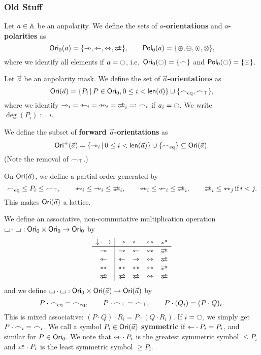 \documentclass[a4paper]{memoir}
\begin{document}
\subsubsection{Old Stuff}
\begin{definition}\label{def:orisymbol}
	Let $a \in {\mathbb{A}}$ be an anpolarity.
	We define the sets of \textbf{$a$-orientations} and \textbf{$a$-polarities} as
	\[
		\orisymbolnodegree(a) = \accol{\jetsym, \tejsym, \equijetsym, \infrajetsym},
		\qquad
		\polsymbolnodegree(a) = \accol{\pospol, \negpol, \isopol, \mixpol},
	\]
	where we identify all elements if $a = \npolar$, i.e.\ $\orisymbolnodegree(\npolar) = \accol{\edgesym}$ and $\polsymbolnodegree(\npolar) = \accol{\nonpol}$.
	
	Let $\vec a$ be an anpolarity mask.
	We define the set of \textbf{$\vec a$-orientations} as
	\[
		{\mathsf{Ori}}(\vec a) = \mathopen{}\left\{ P_i \,\middle|\, P \in {\mathsf{Ori}}_0, 0 \leq i < \mathsf{len}(\vec a) \right\}\mathclose{} \cup \mathopen{}\left\{ {\frown}_{{\mathrm{eq}}}, {\frown}_\top \right\}\mathclose{},
	\]
	where we identify $\jetsym_i = \tejsym_i = \equijetsym_i = \infrajetsym_i =: \edgesym_i$ if $a_i = \npolar$.
	We write $\deg(P_i) := i$.
	
	We define the subset of \textbf{forward $\vec a$-orientations} as
	\[
		{\mathsf{Ori}}^+(\vec a) = \mathopen{}\left\{ {\rightarrowtriangle}_i \,\middle|\, 0 \leq i < \mathsf{len}(\vec a) \right\}\mathclose{} \cup \mathopen{}\left\{ {\frown}_{{\mathrm{eq}}} \right\}\mathclose{} \subseteq {\mathsf{Ori}}(\vec a).
	\]
	(Note the removal of ${\frown}_\top$.)
	
	On ${\mathsf{Ori}}(\vec a)$, we define a partial order generated by
	\[
		\eqtysym \leq P_i \leq \topsym, \qquad
		\equijetsym_i \leq \jetsym_i \leq \infrajetsym_i, \qquad
		\equijetsym_i \leq \tejsym_i \leq \infrajetsym_i, \qquad
		\infrajetsym_i \leq \equijetsym_j\,\text{if}\,i < j.
	\]
	This makes ${\mathsf{Ori}}(\vec a)$ a lattice.
	
	We define an associative, non-commutative multiplication operation ${\llcorner\hspace{-.4ex}\lrcorner} \cdot {\llcorner\hspace{-.4ex}\lrcorner} : {\mathsf{Ori}}_0 \times {\mathsf{Ori}}_0 \to {\mathsf{Ori}}_0$ by
	\[
		\begin{array}{c | c c c c}
			{\downarrow} \cdot {\rightarrow} & \jetsym & \tejsym & \equijetsym & \infrajetsym \\ \hline
			\jetsym & \jetsym & \tejsym & \equijetsym & \infrajetsym \\
			\tejsym & \tejsym & \jetsym & \equijetsym & \infrajetsym \\
			\equijetsym & \equijetsym & \equijetsym & \equijetsym & \infrajetsym \\
			\infrajetsym & \infrajetsym & \infrajetsym & \equijetsym & \infrajetsym
		\end{array}
	\]
	and we define ${\llcorner\hspace{-.4ex}\lrcorner} \cdot {\llcorner\hspace{-.4ex}\lrcorner} : {\mathsf{Ori}}_0 \times {\mathsf{Ori}}(\vec a) \to {\mathsf{Ori}}(\vec a)$ by
	\[
		P \cdot {\frown}_{{\mathrm{eq}}} = {\frown}_{{\mathrm{eq}}}, \qquad
		P \cdot {\frown}_\top = {\frown}_\top, \qquad
		P \cdot (Q_i) = (P \cdot Q)_i.
	\]
	This is mixed associative: $(P \cdot Q) \cdot R_i = P \cdot (Q \cdot R_i)$.
	If $i = \npolar$, we simply get $P \cdot {\frown}_i = {\frown}_i$.
	We call a symbol $P_i \in {\mathsf{Ori}}(\vec a)$ \textbf{symmetric} if ${\leftarrowtriangle} \cdot P_i = P_i$, and similar for $P \in {\mathsf{Ori}}_0$.
	We note that ${\leftrightarrowtriangle} \cdot P_i$ is the greatest symmetric symbol $\leq P_i$ and $\infrajetsym \cdot P_i$ is the least symmetric symbol $\geq P_i$.
	

\end{definition}
\end{document}
